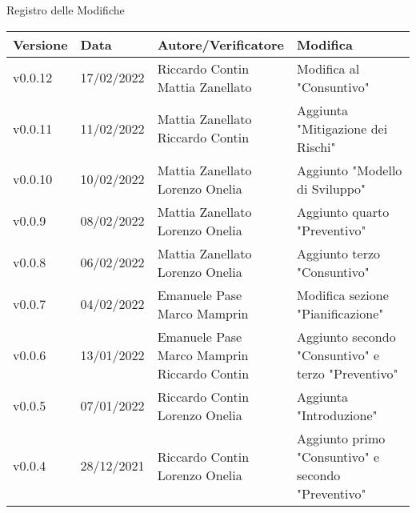 \begin{center}
  \huge{Registro delle Modifiche}
\end{center}
\newcommand{\aCapo}[1]{%
  \begin{tabular}{@{}c@{}}\strut#1\strut\end{tabular}%
}
\begin{center}
  \begin{longtable}{|p{2cm}|p{2cm}|p{4cm}|p{5cm}|}
    \hline
    \textbf{Versione} & \textbf{Data} & \textbf{Autore/Verificatore} & \textbf{Modifica}     \\ \hline
    v0.0.12           & 17/02/2022    & \aCapo{Riccardo Contin\\Mattia Zanellato}             & Modifica al "Consuntivo" \\ \hline
    v0.0.11           & 11/02/2022    & \aCapo{Mattia Zanellato\\Riccardo Contin}             & Aggiunta "Mitigazione dei Rischi" \\ \hline
    v0.0.10           & 10/02/2022    & \aCapo{Mattia Zanellato\\Lorenzo Onelia}              & Aggiunto "Modello di Sviluppo" \\ \hline
    v0.0.9            & 08/02/2022    & \aCapo{Mattia Zanellato\\Lorenzo Onelia}              & Aggiunto quarto "Preventivo" \\ \hline
    v0.0.8            & 06/02/2022    & \aCapo{Mattia Zanellato\\Lorenzo Onelia}              & Aggiunto terzo "Consuntivo" \\ \hline
    v0.0.7            & 04/02/2022    & \aCapo{Emanuele Pase\\Marco Mamprin}                  & Modifica sezione "Pianificazione" \\ \hline
    v0.0.6            & 13/01/2022    & \aCapo{Emanuele Pase\\Marco Mamprin\\Riccardo Contin} & Aggiunto secondo "Consuntivo" e terzo "Preventivo" \\ \hline
    v0.0.5            & 07/01/2022    & \aCapo{Riccardo Contin\\Lorenzo Onelia}               & Aggiunta "Introduzione" \\ \hline
    v0.0.4            & 28/12/2021    & \aCapo{Riccardo Contin\\Lorenzo Onelia}               & Aggiunto primo "Consuntivo" e secondo "Preventivo" \\ \hline

\end{longtable}
\end{center}

